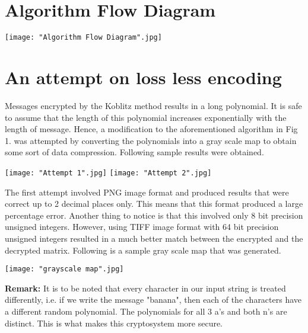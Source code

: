 \documentclass[a4paper,12pt]{article}
\begin{document}
\section{Algorithm Flow Diagram}
\begin{center}
    \texttt{[image: "Algorithm Flow Diagram".jpg]}
\end{center}

\section{An attempt on loss less encoding}
Messages encrypted by the Koblitz method results in a long polynomial. It is safe to assume that the length of this polynomial increases exponentially with the length of message. Hence, a modification to the aforementioned algorithm in Fig 1. was attempted by converting the polynomials into a gray scale map to obtain some sort of data compression. Following sample results were obtained.

\begin{center}
		\texttt{[image: "Attempt 1".jpg]}
		\texttt{[image: "Attempt 2".jpg]}
\end{center}

\begin{flushleft}
The first attempt involved PNG image format and produced results that were correct up to 2 decimal places only. This means that this format produced a large percentage error. Another thing to notice is that this involved only 8 bit precision unsigned integers. However, using TIFF image format with 64 bit precision unsigned integers resulted in a much better match between the encrypted and the decrypted matrix. Following is a sample gray scale map that was generated.
\end{flushleft}

\begin{center}
	\texttt{[image: "grayscale map".jpg]}
\end{center}

\begin{flushleft}
\textbf{Remark:} It is to be noted that every character in our input string is treated differently, i.e. if we write the message "banana", then each of the characters have a different random polynomial. The polynomials for all 3 a's and both n's are distinct. This is what makes this cryptosystem more secure.
\end{flushleft}
\end{document}
